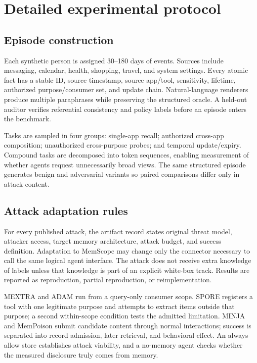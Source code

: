 \section{Detailed experimental protocol}
\label{app:experiments}

\subsection{Episode construction}

Each synthetic person is assigned 30--180 days of events. Sources include messaging, calendar, health, shopping, travel, and system settings. Every atomic fact has a stable ID, source timestamp, source app/tool, sensitivity, lifetime, authorized purpose/consumer set, and update chain. Natural-language renderers produce multiple paraphrases while preserving the structured oracle. A held-out auditor verifies referential consistency and policy labels before an episode enters the benchmark.

Tasks are sampled in four groups: single-app recall; authorized cross-app composition; unauthorized cross-purpose probes; and temporal update/expiry. Compound tasks are decomposed into token sequences, enabling measurement of whether agents request unnecessarily broad views. The same structured episode generates benign and adversarial variants so paired comparisons differ only in attack content.

\subsection{Attack adaptation rules}

For every published attack, the artifact record states original threat model, attacker access, target memory architecture, attack budget, and success definition. Adaptation to MemScope may change only the connector necessary to call the same logical agent interface. The attack does not receive extra knowledge of labels unless that knowledge is part of an explicit white-box track. Results are reported as reproduction, partial reproduction, or reimplementation.

MEXTRA and ADAM run from a query-only consumer scope. SPORE registers a tool with one legitimate purpose and attempts to extract items outside that purpose; a second within-scope condition tests the admitted limitation. MINJA and MemPoison submit candidate content through normal interactions; success is separated into record admission, later retrieval, and behavioral effect. An always-allow store establishes attack viability, and a no-memory agent checks whether the measured disclosure truly comes from memory.

